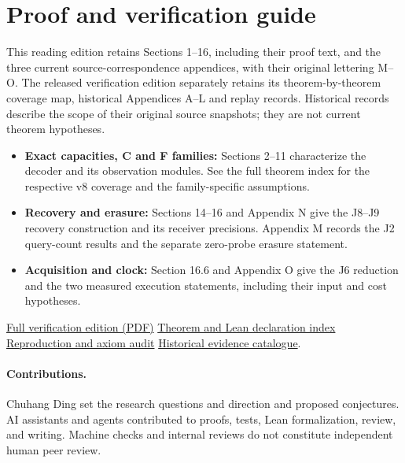 \documentclass[11pt,a4paper]{article}
\begin{document}
\section{Proof and verification guide}\label{paper6-current-coverage}
This reading edition retains Sections 1--16, including their proof text,
and the three current source-correspondence appendices, with their
original lettering M--O. The released verification edition separately
retains its theorem-by-theorem coverage map, historical Appendices A--L
and replay records. Historical records describe the scope of their
original source snapshots; they are not current theorem hypotheses.

\begin{itemize}
\item \textbf{Exact capacities, C and F families:} Sections 2--11
  characterize the decoder and its observation modules. See the full
  theorem index for the respective v8 coverage and the family-specific
  assumptions.
\item \textbf{Recovery and erasure:} Sections 14--16 and Appendix N give
  the J8--J9 recovery construction and its receiver precisions. Appendix
  M records the J2 query-count results and the separate zero-probe
  erasure statement.
\item \textbf{Acquisition and clock:} Section 16.6 and Appendix O give
  the J6 reduction and the two measured execution statements, including
  their input and cost hypotheses.
\end{itemize}

\noindent\href{https://github.com/dch-and-Elara/some-research-inspired-by-openais-eth-preprint/blob/ebab675ea9d4330e8f62db9c83e8e3692f77dc0e/checked-retained-execution/paper/Paper6.pdf}{Full verification edition (PDF)}
\quad\href{https://github.com/dch-and-Elara/some-research-inspired-by-openais-eth-preprint/blob/ebab675ea9d4330e8f62db9c83e8e3692f77dc0e/checked-retained-execution/THEOREMS.md}{Theorem and Lean declaration index}
\quad\href{https://github.com/dch-and-Elara/some-research-inspired-by-openais-eth-preprint/blob/ebab675ea9d4330e8f62db9c83e8e3692f77dc0e/checked-retained-execution/VERIFICATION.md}{Reproduction and axiom audit}
\quad\href{https://github.com/dch-and-Elara/some-research-inspired-by-openais-eth-preprint/blob/ebab675ea9d4330e8f62db9c83e8e3692f77dc0e/checked-retained-execution/paper/EVIDENCE_CATALOG.md}{Historical evidence catalogue}.

\paragraph*{Contributions.}
Chuhang Ding set the research questions and direction and proposed conjectures.
AI assistants and agents contributed to proofs, tests, Lean formalization, review,
and writing. Machine checks and internal reviews do not constitute independent
human peer review.
\end{document}
